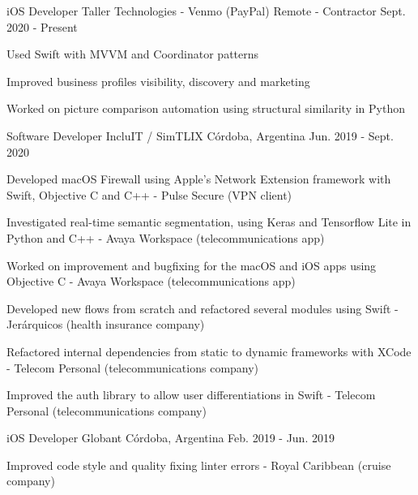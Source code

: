 \documentclass[10pt, a4paper]{resume}
\begin{document}
\begin{cventries}

    \cventry
    {iOS Developer}
    {Taller Technologies - Venmo (PayPal)}
    {Remote - Contractor}
    {Sept. 2020 - Present}
    {
        \begin{cvitems}
        \item {Used Swift with MVVM and Coordinator patterns}
        \item {Improved business profiles visibility, discovery and marketing}
        \item {Worked on picture comparison automation using structural similarity in Python}
        \end{cvitems}
    }


    \cventry
    {Software Developer}
    {IncluIT / SimTLIX}
    {Córdoba, Argentina}
    {Jun. 2019 - Sept. 2020}
    {
        \begin{cvitems}
        \item{Developed macOS Firewall using Apple’s Network Extension framework with Swift, Objective C and C++ - Pulse Secure (VPN client)}
        \item{Investigated real-time semantic segmentation, using Keras and Tensorflow Lite in Python and C++ - Avaya Workspace (telecommunications app)}
        \item{Worked on improvement and bugfixing for the macOS and iOS apps using Objective C - Avaya Workspace (telecommunications app)}
        \item{Developed new flows from scratch and refactored several modules using Swift - Jerárquicos (health insurance company)}
        \item{Refactored internal dependencies from static to dynamic frameworks with XCode - Telecom Personal (telecommunications company)}
        \item{Improved the auth library to allow user differentiations in Swift - Telecom Personal (telecommunications company)}
        \end{cvitems}
    }

    \cventry
    {iOS Developer}
    {Globant}
    {Córdoba, Argentina}
    {Feb. 2019 - Jun. 2019}
    {
        \begin{cvitems}
        \item{Improved code style and quality fixing linter errors - Royal Caribbean (cruise company)}
        \end{cvitems}
    }


\end{cventries}
\end{document}
